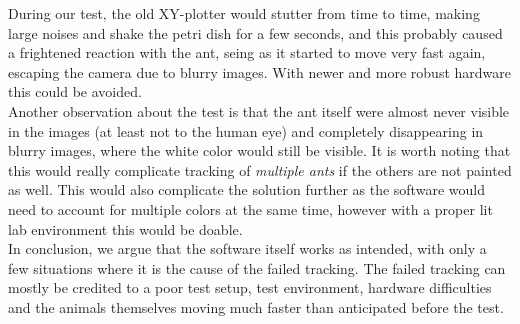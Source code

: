 During our test, the old XY-plotter would stutter from time to time, making large noises and shake the petri dish for a few seconds, and this probably caused a frightened reaction with the ant, seing as it started to move very fast again, escaping the camera due to blurry images. With newer and more robust hardware this could be avoided. \\

Another observation about the test is that the ant itself were almost never visible in the images (at least not to the human eye) and completely disappearing in blurry images, where the white color would still be visible. It is worth noting that this would really complicate tracking of \emph{multiple ants} if the others are not painted as well. This would also complicate the solution further as the software would need to account for multiple colors at the same time, however with a proper lit lab environment this would be doable.\\

In conclusion, we argue that the software itself works as intended, with only a few situations where it is the cause of the failed tracking. The failed tracking can mostly be credited to a poor test setup, test environment, hardware difficulties and the animals themselves moving much faster than anticipated before the test.\\
